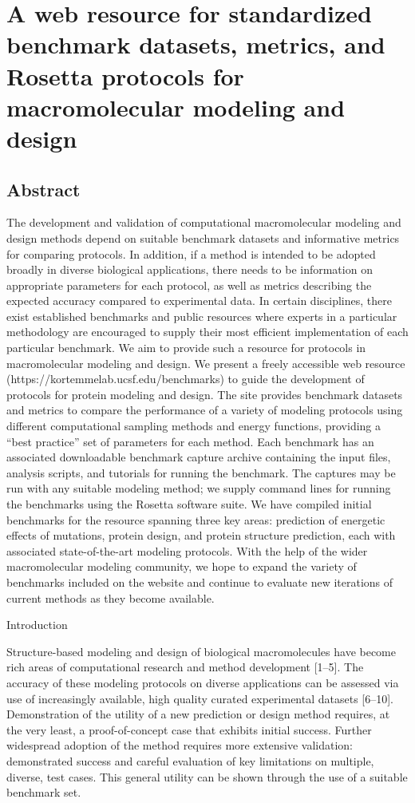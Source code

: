 \chapter{A web resource for standardized benchmark datasets, metrics, and Rosetta protocols for macromolecular modeling and design}
\label{chapter:web-benchmark}


\section{Abstract}

The development and validation of computational macromolecular modeling and design methods depend on suitable benchmark datasets and informative metrics for comparing protocols. In addition, if a method is intended to be adopted broadly in diverse biological applications, there needs to be information on appropriate parameters for each protocol, as well as metrics describing the expected accuracy compared to experimental data. In certain disciplines, there exist established benchmarks and public resources where experts in a particular methodology are encouraged to supply their most efficient implementation of each particular benchmark. We aim to provide such a resource for protocols in macromolecular modeling and design. We present a freely accessible web resource (https://kortemmelab.ucsf.edu/benchmarks) to guide the development of protocols for protein modeling and design. The site provides benchmark datasets and metrics to compare the performance of a variety of modeling protocols using different computational sampling methods and energy functions, providing a “best practice” set of parameters for each method. Each benchmark has an associated downloadable benchmark capture archive containing the input files, analysis scripts, and tutorials for running the benchmark. The captures may be run with any suitable modeling method; we supply command lines for running the benchmarks using the Rosetta software suite. We have compiled initial benchmarks for the resource spanning three key areas: prediction of energetic effects of mutations, protein design, and protein structure prediction, each with associated state-of-the-art modeling protocols. With the help of the wider macromolecular modeling community, we hope to expand the variety of benchmarks included on the website and continue to evaluate new iterations of current methods as they become available.


Introduction

Structure-based modeling and design of biological macromolecules have become rich areas of computational research and method development [1–5]. The accuracy of these modeling protocols on diverse applications can be assessed via use of increasingly available, high quality curated experimental datasets [6–10]. Demonstration of the utility of a new prediction or design method requires, at the very least, a proof-of-concept case that exhibits initial success. Further widespread adoption of the method requires more extensive validation: demonstrated success and careful evaluation of key limitations on multiple, diverse, test cases. This general utility can be shown through the use of a suitable benchmark set.

